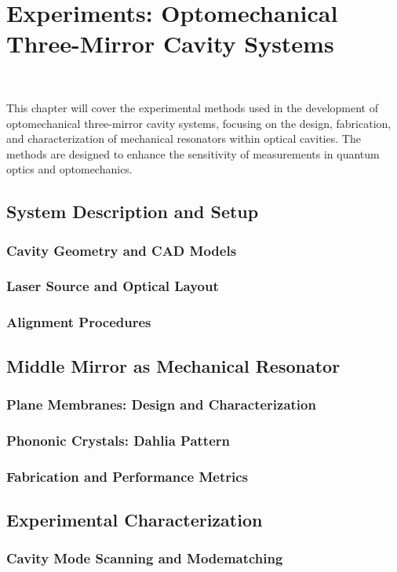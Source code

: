 \chapter{Experiments: Optomechanical Three-Mirror Cavity Systems}
\minitoc\

This chapter will cover the experimental methods used in the development of optomechanical three-mirror cavity systems, focusing on the design, fabrication, and characterization of mechanical resonators within optical cavities. The methods are designed to enhance the sensitivity of measurements in quantum optics and optomechanics.
\section{System Description and Setup}
\subsection{Cavity Geometry and CAD Models}
\subsection{Laser Source and Optical Layout}
\subsection{Alignment Procedures}
\section{Middle Mirror as Mechanical Resonator}
\subsection{Plane Membranes: Design and Characterization}
\subsection{Phononic Crystals: Dahlia Pattern}
\subsection{Fabrication and Performance Metrics}
\section{Experimental Characterization}
\subsection{Cavity Mode Scanning and Modematching}
